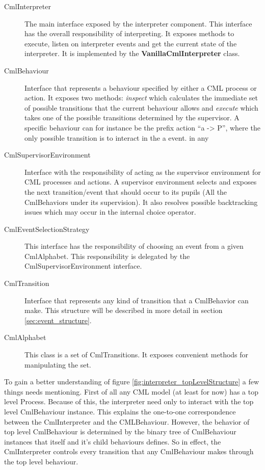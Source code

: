 \documentclass[a4paper, 12pt]{include/compassreport}   %
\begin{document}
\begin{description}
\item[CmlInterpreter] The main interface exposed by
  the interpreter component. This interface has the overall
  responsibility of interpreting. It exposes methods to execute, listen
  on interpreter events and get the current state of the interpreter. It
  is implemented by the \textbf{VanillaCmlInterpreter} class.
\item[CmlBehaviour] Interface that represents a behaviour specified by
  either a CML process or action. It exposes two methods: \emph{inspect}
  which calculates the immediate set of possible transitions that the
  current behaviour allows and \emph{execute} which takes one of the
  possible transitions determined by the supervisor. A specific
  behaviour can for instance be the prefix action ``a -> P'', where the
  only possible transition is to interact in the a event.  in any
\item [CmlSupervisorEnvironment] Interface with the responsibility of
  acting as the supervisor environment for CML processes and actions. A
  supervisor environment selects and exposes the next transition/event
  that should occur to its pupils (All the CmlBehaviors under its
  supervision). It also resolves possible backtracking issues which
  may occur in the internal choice operator. 
\item[CmlEventSelectionStrategy] This interface has the responsibility
  of choosing an event from a given CmlAlphabet. This responsibility is
  delegated by the CmlSupervisorEnvironment interface.
\item[CmlTransition] Interface that represents any kind of transition that
  a CmlBehavior can make. This structure will be described in more
  detail in section \ref{sec:event_structure}.
\item[CmlAlphabet] This class is a set of CmlTransitions. It exposes
  convenient methods for manipulating the set.
\end{description}

To gain a better understanding of figure
\ref{fig:interpreter_topLevelStructure} a few things needs
mentioning. First of all any CML model (at least for now) has a top
level Process. Because of this, the interpreter need only to interact
with the top level CmlBehaviour instance. This explains the one-to-one
correspondence between the CmlInterpreter and the
CMLBehaviour. However, the behavior of top level CmlBehaviour is
determined by the binary tree of CmlBehaviour instances that itself
and it's child behaviours defines. So in effect, the CmlInterpreter
controls every transition that any CmlBehaviour makes through the top
level behaviour.
\end{document}
